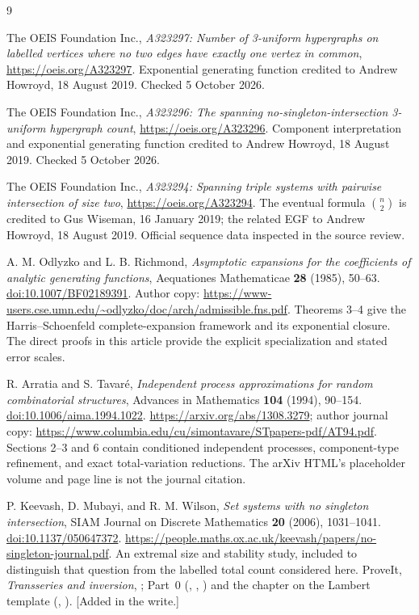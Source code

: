 \begin{thebibliography}{9}
The OEIS Foundation Inc., \emph{A323297: Number of 3-uniform hypergraphs on labelled vertices where no two edges have exactly one vertex in common},
\url{https://oeis.org/A323297}.
Exponential generating function credited to Andrew Howroyd, 18 August 2019. Checked 5 October 2026.

The OEIS Foundation Inc., \emph{A323296: The spanning no-singleton-intersection 3-uniform hypergraph count},
\url{https://oeis.org/A323296}.
Component interpretation and exponential generating function credited to Andrew Howroyd, 18 August 2019. Checked 5 October 2026.

The OEIS Foundation Inc., \emph{A323294: Spanning triple systems with pairwise intersection of size two},
\url{https://oeis.org/A323294}.
The eventual formula $\binom n2$ is credited to Gus Wiseman, 16 January 2019; the related EGF to Andrew Howroyd, 18 August 2019. Official sequence data inspected in the source review.

A. M. Odlyzko and L. B. Richmond,
\emph{Asymptotic expansions for the coefficients of analytic generating functions},
Aequationes Mathematicae \textbf{28} (1985), 50--63.
\href{https://doi.org/10.1007/BF02189391}{doi:10.1007/BF02189391}.
Author copy: \url{https://www-users.cse.umn.edu/~odlyzko/doc/arch/admissible.fns.pdf}.
Theorems 3--4 give the Harris--Schoenfeld complete-expansion framework and its exponential closure. The direct proofs in this article provide the explicit specialization and stated error scales.

R. Arratia and S. Tavar\'e,
\emph{Independent process approximations for random combinatorial structures},
Advances in Mathematics \textbf{104} (1994), 90--154.
\href{https://doi.org/10.1006/aima.1994.1022}{doi:10.1006/aima.1994.1022}.
\url{https://arxiv.org/abs/1308.3279};
author journal copy: \url{https://www.columbia.edu/cu/simontavare/STpapers-pdf/AT94.pdf}.
Sections 2--3 and 6 contain conditioned independent processes, component-type refinement, and exact total-variation reductions. The arXiv HTML's placeholder volume and page line is not the journal citation.

P. Keevash, D. Mubayi, and R. M. Wilson,
\emph{Set systems with no singleton intersection},
SIAM Journal on Discrete Mathematics \textbf{20} (2006), 1031--1041.
\href{https://doi.org/10.1137/050647372}{doi:10.1137/050647372}.
\url{https://people.maths.ox.ac.uk/keevash/papers/no-singleton-journal.pdf}.
An extremal size and stability study, included to distinguish that question from the labelled total count considered here.
ProveIt, \emph{Transseries and inversion}, ; Part~0 (, , ) and the chapter on the Lambert template (, ). [Added in the write.]
\end{thebibliography}
